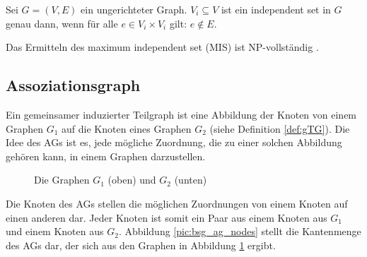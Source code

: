 \begin{mydef}
Sei $G=(V,E)$ ein ungerichteter Graph. $V_i \subseteq V$ ist 
ein independent set in $G$ genau dann, wenn für alle $e \in V_i \times 
V_i$ gilt: $e \notin E$.
\end{mydef}

Das Ermitteln des maximum independent set (MIS) ist NP-vollständig \cite{Garey:1990}.

\subsection{Assoziationsgraph}
Ein gemeinsamer induzierter Teilgraph ist eine Abbildung der Knoten 
von einem Graphen $G_1$ auf die Knoten eines Graphen $G_2$ (siehe Definition \ref{def:gTG}). 
Die Idee des AGs ist es, jede mögliche Zuordnung, die zu einer 
solchen Abbildung gehören kann, in einem Graphen darzustellen.


\begin{figure}[htb]
\centering
\vspace{0.5cm}
\caption{Die Graphen $G_1$ (oben) und $G_2$ (unten)}
\label{pic:bsg_ag_graphs}
\end{figure}

Die Knoten des AGs stellen die möglichen Zuordnungen von einem Knoten auf 
einen anderen dar. Jeder Knoten ist somit ein Paar aus einem Knoten aus $G_1$ 
und einem Knoten aus $G_2$. Abbildung \ref{pic:bsg_ag_nodes} stellt die Kantenmenge des AGs 
dar, der sich aus den Graphen in Abbildung \ref{pic:bsg_ag_graphs} ergibt.


